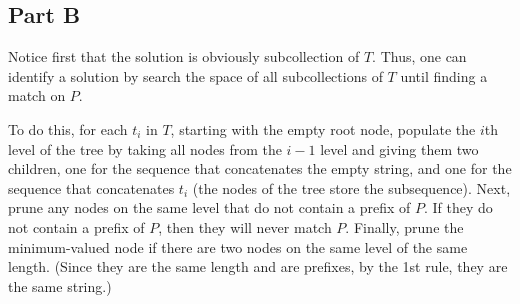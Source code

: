 \documentclass[12pt]{article}
\begin{document}
\subsection{Part B}

Notice first that the solution is obviously subcollection of $T$. Thus, one can identify a solution by search the space of all subcollections of $T$ until finding a match on $P$.

To do this, for each $t_{i}$ in $T$, starting with the empty root node, populate the $i$th level of the tree by taking all nodes from the $i-1$ level and giving them two children, one for the sequence that concatenates the empty string, and one for the sequence that concatenates $t_{i}$ (the nodes of the tree store the subsequence). Next, prune any nodes on the same level that do not contain a prefix of $P$. If they do not contain a prefix of $P$, then they will never match $P$. Finally, prune the minimum-valued node if there are two nodes on the same level of the same length. (Since they are the same length and are prefixes, by the 1st rule, they are the same string.)
\end{document}
